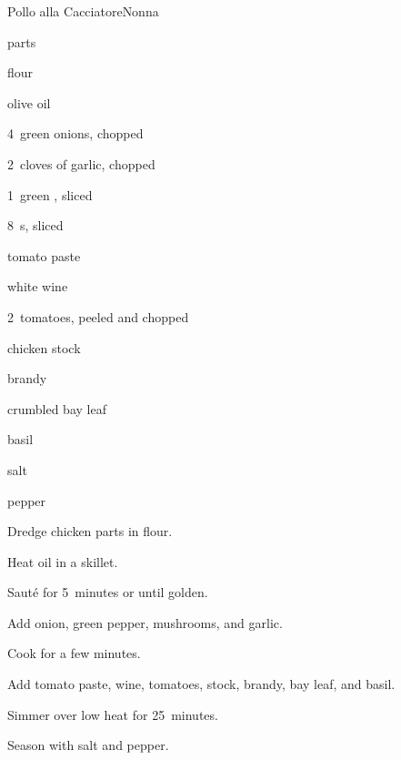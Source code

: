 \begin{recipe}{Pollo alla Cacciatore}{Nonna}{}

\begin{ingredients}
\item {}  parts
\item \C{\half} flour
\item {} olive oil
\item 4~green onions, chopped
\item 2~cloves of garlic, chopped
\item 1~green , sliced
\item 8~s, sliced
\item {} tomato paste
\item \C{\half} white wine
\item 2~tomatoes, peeled and chopped
\item \C{\threequarter} chicken stock
\item \C{\quarter} brandy
\item crumbled bay leaf
\item basil
\item salt
\item pepper
\end{ingredients}

\begin{directions}
\item Dredge chicken parts in flour.
\item Heat oil in a skillet.
\item Saut\'e for 5~minutes or until golden.
\item Add onion, green pepper, mushrooms, and garlic.
\item Cook for a few minutes.
\item Add tomato paste, wine, tomatoes, stock, brandy, bay leaf, and basil.
\item Simmer over low heat for 25~minutes.
\item Season with salt and pepper.
\end{directions}

\end{recipe}
